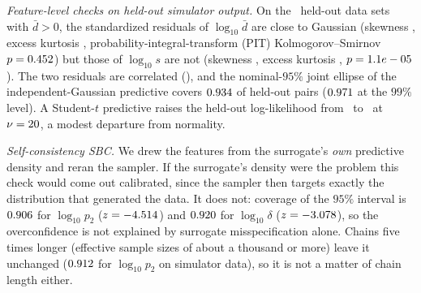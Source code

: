 \documentclass[sn-basic,iicol,pdflatex]{sn-jnl}
\begin{document}
\emph{Feature-level checks on held-out simulator output.} On the \pfcNTestNonzero\ held-out data sets with $\bar d>0$, the standardized residuals of
$\log_{10}\bar d$ are close to Gaussian (skewness \pfcLogDbarSkew, excess kurtosis \pfcLogDbarExcessKurt, probability-integral-transform (PIT) Kolmogorov--Smirnov $p=0.452$) but those of $\log_{10}s$ are
not (skewness \pfcLogSSkew, excess kurtosis \pfcLogSExcessKurt, $p=1.1e-05$). The two residuals are correlated (\pfcJointCorr), and the nominal-$95\%$ joint ellipse of the
independent-Gaussian predictive covers $0.934$ of held-out pairs ($0.971$ at the $99\%$ level). A Student-$t$
predictive raises the held-out log-likelihood from \pfcValLoglikGauss\ to \pfcValLoglikT\ at $\nu=20$, a modest departure from normality.

\emph{Self-consistency SBC.} We drew the features from the surrogate's \emph{own} predictive density and reran the sampler. If the surrogate's
density were the problem this check would come out calibrated, since the sampler then targets exactly the distribution that generated the data. It does not:
coverage of the $95\%$ interval is $0.906$ for $\log_{10}p_2$ ($z=-4.514$) and $0.920$ for $\log_{10}\delta$ ($z=-3.078$), so the
overconfidence is not explained by surrogate misspecification alone. Chains five times longer (effective sample sizes of about a thousand or more) leave it unchanged
($0.912$ for $\log_{10}p_2$ on simulator data), so it is not a matter of chain length either.
\end{document}
